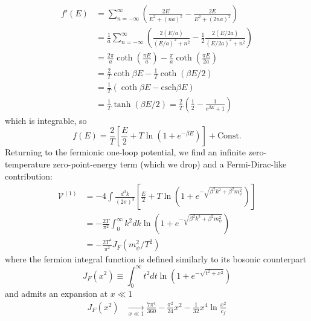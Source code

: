 \documentclass[%
 reprint,
nofootinbib,
 amsmath,amssymb,
 aps,
floatfix,
]{revtex4-1}
\DeclareMathOperator{\V}{\mathcal{V}}
\newcommand\underrel[2]{\mathrel{\mathop{#2}\limits_{#1}}}
\begin{document}
\begin{equation}
\begin{split}
    f'(E) &= \sum_{n=-\infty}^{\infty} \left(\frac{2E}{E^2+(na)^2}-\frac{2E}{E^2+(2na)^2}\right) \\
    &= \frac{1}{a}\sum_{n=-\infty}^{\infty} \left(\frac{2(E/a)}{(E/a)^2+n^2} - \frac{1}{2} \frac{2(E/2a)}{(E/2a)^2+n^2}\right) \\
    &= \frac{2\pi}{a}\coth\left(\frac{\pi E}{a}\right) - \frac{\pi}{a}\coth\left(\frac{\pi E}{2a}\right) \\
    &= \frac{2}{T}\coth\beta E - \frac{1}{T}\coth\left(\beta E/ 2\right) \\
    &= \frac{1}{T}\left(\coth \beta E - \text{csch}\beta E\right) \\
    &= \frac{1}{T}\tanh(\beta E / 2) = \frac{2}{T}\left(\frac{1}{2} - \frac{1}{e^{\beta E} +1}\right)
\end{split}
\end{equation}
which is integrable, so
\begin{equation}
    f(E) = \frac{2}{T} \left[\frac{E}{2} + T \ln \left(1 + e^{-\beta E}\right)\right] + \text{Const.}
\end{equation}
Returning to the fermionic one-loop potential, we find an infinite zero-temperature zero-point-energy term (which we drop) and a Fermi-Dirac-like contribution:
\begin{align}
    \V^{(1)} &= -4 \int \frac{d^3k}{(2\pi)^3} \left[\frac{E}{2} + T\ln \left(1+e^{-\sqrt{\beta^2 k^2+\beta^2m_\psi^2}}\right)\right]\\
    &= -\frac{2T}{\pi^2} \int_{0}^{\infty} k^2 dk \ln \left(1+e^{-\sqrt{\beta^2 k^2+\beta^2m_\psi^2}}\right) \\
    &= -\frac{2T^4}{\pi^2} J_F \left(m_\psi^2/T^2\right)
\end{align}
where the fermion integral function is defined similarly to its bosonic counterpart
\begin{equation}
    J_F \left(x^2\right) \equiv \int_0^\infty t^2 dt \ln \left(1+e^{-\sqrt{t^2+x^2}}\right)
\end{equation}
and admits an expansion at $x \ll 1$ \cite{quiros99}
\begin{equation}
\begin{split}
    J_F \left(x^2\right) &\underrel{x\ll1}{\rightarrow} \frac{7\pi^4}{360} - \frac{\pi^2}{24}x^2 - \frac{1}{32} x^4\ln \frac{x^2}{c_f}
\end{split}
\end{equation}
\end{document}
